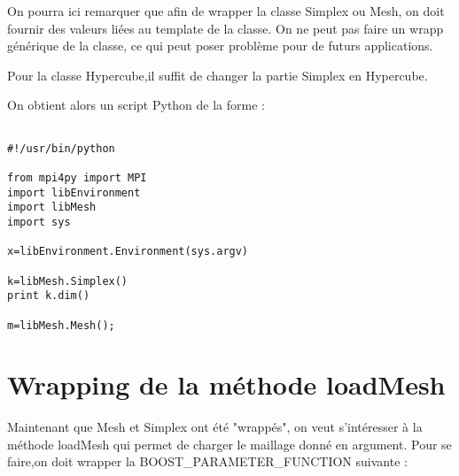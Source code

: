 \documentclass[12pt]{article}
\begin{document}
On pourra ici remarquer que afin de wrapper la classe Simplex ou Mesh, on doit fournir des valeurs liées au template de la classe. On ne peut pas faire un wrapp générique de la classe, ce qui peut poser problème pour de futurs applications.

Pour la classe Hypercube,il suffit de changer la partie Simplex en Hypercube.

On obtient alors un script Python de la forme :

\begin{lstlisting}

#!/usr/bin/python

from mpi4py import MPI
import libEnvironment
import libMesh
import sys

x=libEnvironment.Environment(sys.argv)

k=libMesh.Simplex()
print k.dim()

m=libMesh.Mesh();
\end{lstlisting}


\section{Wrapping de la méthode loadMesh}

Maintenant que Mesh et Simplex ont été "wrappés", on veut s'intéresser à la méthode loadMesh qui permet de charger le maillage donné en argument. Pour se faire,on doit wrapper la BOOST\_PARAMETER\_FUNCTION suivante :
\end{document}
